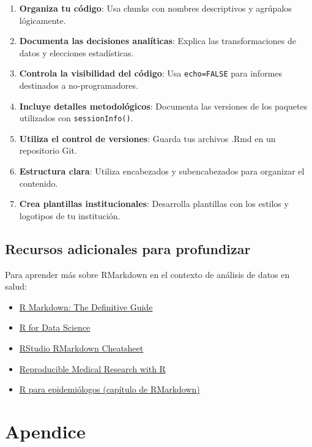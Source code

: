 \documentclass[
  letterpaper,
  DIV=11,
  numbers=noendperiod]{scrreprt}
\providecommand{\tightlist}{%
  \setlength{\itemsep}{0pt}\setlength{\parskip}{0pt}}\usepackage{longtable,booktabs,array}
\begin{document}
\begin{enumerate}
\def\labelenumi{\arabic{enumi}.}
\tightlist
\item
  \textbf{Organiza tu código}: Usa chunks con nombres descriptivos y
  agrúpalos lógicamente.
\item
  \textbf{Documenta las decisiones analíticas}: Explica las
  transformaciones de datos y elecciones estadísticas.
\item
  \textbf{Controla la visibilidad del código}: Usa \texttt{echo=FALSE}
  para informes destinados a no-programadores.
\item
  \textbf{Incluye detalles metodológicos}: Documenta las versiones de
  los paquetes utilizados con \texttt{sessionInfo()}.
\item
  \textbf{Utiliza el control de versiones}: Guarda tus archivos .Rmd en
  un repositorio Git.
\item
  \textbf{Estructura clara}: Utiliza encabezados y subencabezados para
  organizar el contenido.
\item
  \textbf{Crea plantillas institucionales}: Desarrolla plantillas con
  los estilos y logotipos de tu institución.
\end{enumerate}

\section{Recursos adicionales para
profundizar}\label{recursos-adicionales-para-profundizar}

Para aprender más sobre RMarkdown en el contexto de análisis de datos en
salud:

\begin{itemize}
\tightlist
\item
  \href{https://bookdown.org/yihui/rmarkdown/}{R Markdown: The
  Definitive Guide}
\item
  \href{https://r4ds.had.co.nz/r-markdown.html}{R for Data Science}
\item
  \href{https://www.rstudio.com/resources/cheatsheets/}{RStudio
  RMarkdown Cheatsheet}
\item
  \href{https://bookdown.org/pdr_higgins/rmrwr/}{Reproducible Medical
  Research with R}
\item
  \href{https://www.epirhandbook.com/en/new_pages/rmarkdown.html}{R para
  epidemiólogos (capítulo de RMarkdown)}
\end{itemize}


\chapter{Apendice}\label{apendice}
\end{document}
